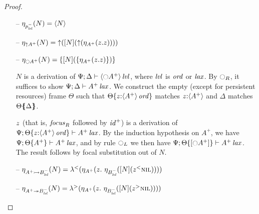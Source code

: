 \begin{proof}
\begin{itemize}
\item[--] $\etana{N}{p^-_\mlvl} = \tetan{N}$
\item[--] $\etana{N}{{\uparrow}A^+} 
           = \tupr{([N](\tupl{(\etapa{z}{\tfocusr{z}}{A^+})}))}$



\item[--] $\etana{N}{{\ocircle}A^+} 
           = \tlaxr{[N](\tlaxl{\etapa{z}{\tfocusr{z}}{A^+}})}$
\smallskip

$N$ is a derivation of 
$\foc{\Psi}{\Delta}{\islvl{\susp{{\ocircle}A^+}}}$, where
$\mlvl$ is $\mtrue$ or $\mlax$.
By ${\ocircle}_R$, it suffices to show $\foc{\Psi}{\Delta}{\islax{A^+}}$.
We construct the empty (except for persistent resources) 
frame $\Theta$ such that 
$\tackon{\Theta}{z{:}\istrue{\susp{A^+}}}$ matches $z{:}\susp{A^+}$
and $\Delta$ matches $\frameoff{\Theta}{\Delta}$. 
\smallskip

$\tfocusr{z}$ (that is, ${\it focus}_R$ followed by ${\it id}^+$) is
a derivation of 
$\foc{\Psi}{\tackon{\Theta}{z{:}\istrue{\susp{A^+}}}}{\islax{A^+}}$. 
By the induction hypothesis on $A^+$, we have
$\foc{\Psi}{\tackon{\Theta}{A^+}}{\islax{A^+}}$, and 
by rule ${\ocircle}_L$ we then have
$\foc{\Psi}{\tackon{\Theta}{[{\ocircle}A^+]}}{\islax{A^+}}$.
The result follows by focal substitution out of $N$.
\smallskip

\item[--] $\etana{N}{A^+ \lefti B^-_\mlvl}
           = \tlaml{(\etapa{z}{~\etana{[N](\tappl{z}{\tnil})}{B^-_\mlvl}}{A^+})}$
\item[--] $\etana{N}{A^+ \righti B^-_\mlvl}
           = \tlamr{(\etapa{z}{~\etana{[N](\tappr{z}{\tnil})}{B^-_\mlvl}}{A^+})}$
\smallskip


\end{itemize}
\end{proof}
